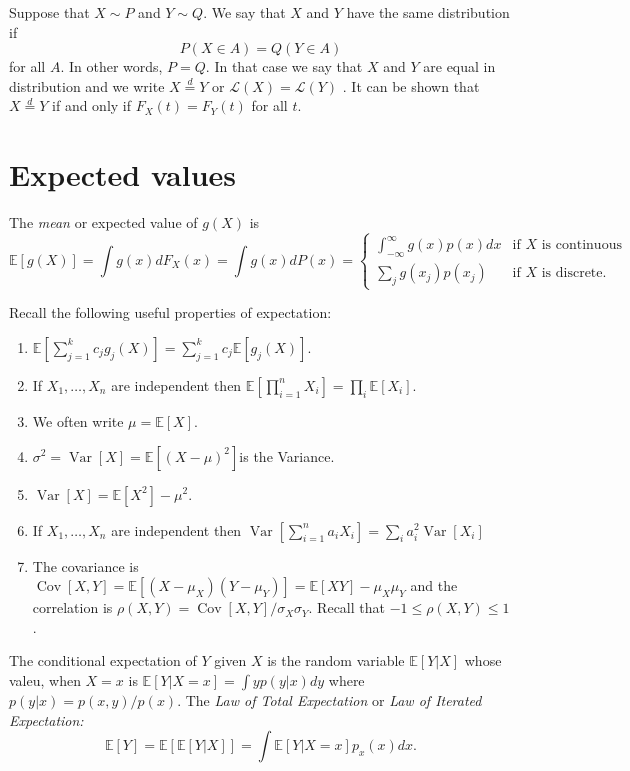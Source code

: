 \documentclass[10pt]{article}
\newcommand{\Expect}[1]{\mathbb{E}\!\left[#1\right]}
\DeclareMathOperator*{\Variance}{Var}
\newcommand{\Var}[1]{\Variance\!\left[#1\right]}
\DeclareMathOperator*{\Covariance}{Cov}
\newcommand{\Cov}[1]{\Covariance\!\left[#1\right]}
\begin{document}
Suppose that $X \sim P$ and $Y \sim Q$. We say that $X$ and $Y$ have
the same distribution if
\begin{equation}
  P(X\in A)=Q(Y \in A)\label{eq:5}
\end{equation}
for all $A$. In other words, $P = Q$. In that case we say that $X$ and
$Y$ are equal in distribution and we write $X \overset{d}{=} Y$ or
$\mathcal{L}(X) = \mathcal{L}(Y)$ . It can be shown that $X
\overset{d}{=} Y$ if and only if 
$F_X(t) = F_Y (t)$ for all $t$.

\section{Expected values}
\label{sec:expected-values}

The {\em mean} or expected value of $g(X)$ is
\begin{equation}
  \label{eq:6}
  \Expect{g(X)} = \int g(x)dF_X(x) = \int g(x) dP(x) = \begin{cases}
    \int_{-\infty}^{\infty} g(x)p(x)dx & \mbox{if $X$ is continuous}\\
    \sum_j g(x_j)p(x_j) & \mbox{if $X$ is discrete.}
  \end{cases}
\end{equation}

Recall the following useful properties of expectation:

\begin{enumerate}
\item $\Expect{\sum^k_{j=1} c_jg_j(X)} = \sum^k_{j=1} c_j\Expect{g_j(X)}.$
\item If $X_1, \ldots , X_n$ are independent then
    $\Expect{ \prod_{i=1}^n X_i } = \prod_i \Expect{X_i}$.
\item We often write $\mu = \Expect{X}$.
\item $\sigma^2 =\Var{X}=\Expect{(X-\mu)^2}$is the Variance.
\item $\Var{X}=\Expect{X^2}-\mu^2.$
\item If $X_1, \ldots , X_n$ are independent then
  $\Var{\sum_{i=1}^n a_i X_i} = \sum_i a_i^2\Var{X_i}$
\item The covariance is $\Cov{X,Y}=\Expect{(X-\mu_X)(Y -\mu_Y)}=\Expect{XY}-\mu_X\mu_Y$
and the correlation is $\rho(X,Y)=\Cov{X,Y}/\sigma_X\sigma_Y$. Recall
that $−1\leq \rho (X,Y)\leq1$.
\end{enumerate}

The conditional expectation of $Y$ given $X$ is the random variable
$\Expect{Y|X}$ whose valeu, when $X=x$ is $\Expect{Y|X=x} = \int y p(y|x) dy$
where $p(y|x) = p(x,y)/p(x)$. The {\em Law of Total Expectation} or
{\em Law of Iterated Expectation:}
\begin{equation}
  \label{eq:8}
  \Expect{Y} = \Expect{\Expect{Y|X}} = \int \Expect{Y|X=x}p_x(x)dx.
\end{equation}
\end{document}
